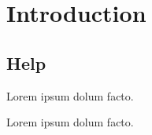 \documentclass{tokh}
\begin{document}
\squelchbackground

\pagebreak
\restorebackground

\chapter{Introduction}

\section{Help}

Lorem ipsum dolum facto.

\clearpage

Lorem ipsum dolum facto.
\end{document}
